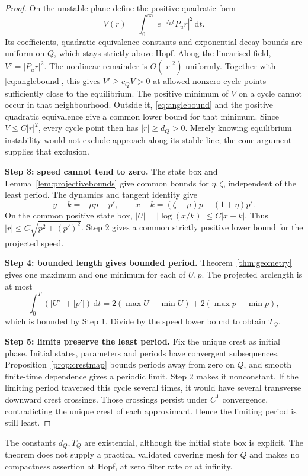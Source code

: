 \documentclass[11pt,a4paper]{article}
\numberwithin{equation}{section}
\theoremstyle{remark}\newtheorem{remark}[theorem]{Remark}
\newcommand{\dd}{\,\mathrm dt}
\begin{document}
\begin{proof}
On the unstable plane define the positive quadratic form
\[
V(r)=\int_0^\infty |e^{-J_Et}P_ur|^2\dd.
\]
Its coefficients, quadratic equivalence constants and exponential decay bounds are uniform on $Q$, which stays strictly above Hopf. Along the linearised field, $V'=|P_ur|^2$. The nonlinear remainder is $O(|r|^2)$ uniformly. Together with \eqref{eq:anglebound}, this gives $V'\ge c_QV>0$ at allowed nonzero cycle points sufficiently close to the equilibrium.
The positive minimum of $V$ on a cycle cannot occur in that neighbourhood. Outside it, \eqref{eq:anglebound} and the positive quadratic equivalence give a common lower bound for that minimum. Since $V\le C|r|^2$, every cycle point then has $|r|\ge d_Q>0$. Merely knowing equilibrium instability would not exclude approach along its stable line; the cone argument supplies that exclusion.

\textbf{Step 3: speed cannot tend to zero.}
The state box and Lemma~\ref{lem:projectivebounds} give common bounds for $\eta,\zeta$, independent of the least period. The dynamics and tangent identity give
\begin{equation}\label{eq:speedrelations}
y-k=-\mu p-p',\qquad
x-k=(\zeta-\mu)p-(1+\eta)p'.
\end{equation}
On the common positive state box, $|U|=|\log(x/k)|\le C|x-k|$. Thus
$|r|\le C\sqrt{p^2+(p')^2}$. Step 2 gives a common strictly positive lower bound for the projected speed.

\textbf{Step 4: bounded length gives bounded period.}
Theorem~\ref{thm:geometry} gives one maximum and one minimum for each of $U,p$. The projected arclength is at most
\[
\int_0^T(|U'|+|p'|)\dd
=2(\max U-\min U)+2(\max p-\min p),
\]
which is bounded by Step 1. Divide by the speed lower bound to obtain $T_Q$.

\textbf{Step 5: limits preserve the least period.}
Fix the unique crest as initial phase. Initial states, parameters and periods have convergent subsequences. Proposition~\ref{prop:crestmap} bounds periods away from zero on $Q$, and smooth finite-time dependence gives a periodic limit. Step 2 makes it nonconstant. If the limiting period traversed this cycle several times, it would have several transverse downward crest crossings. Those crossings persist under $C^1$ convergence, contradicting the unique crest of each approximant. Hence the limiting period is still least.
\end{proof}
The constants $d_Q,T_Q$ are existential, although the initial state box is explicit. The theorem does not supply a practical validated covering mesh for $Q$ and makes no compactness assertion at Hopf, at zero filter rate or at infinity.
\end{document}
